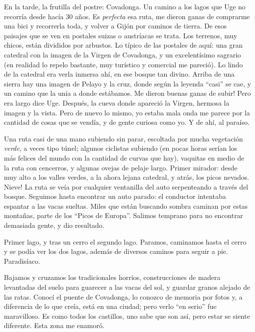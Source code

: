 En la tarde, la frutilla del postre: Covadonga. Un camino a los lagos que Uge
no recorr\'ia desde hac\'ia 30 a\~nos. Es \emph{perfecta} esa ruta, me dieron
ganas de comprarme una bici y recorrerla toda, y volver a Gij\'on por caminos
de tierra. De esos paisajes que se ven en postales suizas o austr\'iacas se
trata. Los terrenos, muy chicos, est\'an divididos por arbustos. Lo t\'ipico
de las postales de aqu\'i: una gran catedral con la imagen de la Virgen de
Covadonga, y un excelent\'isimo sagrario (en realidad lo repelo bastante, muy
tur\'istico y comercial me pareci\'o). Lo lindo de la catedral era verla inmersa
ah\'i, en ese bosque tan divino. Arriba de una sierra hay una imagen de Pelayo y
la cruz, donde seg\'un la leyenda ``casi'' se cae, y un camino que la un\'ia a
donde est\'abamos. \textexclamdown Me dieron buenas ganas de subir! Pero era
largo dice Uge. Despu\'es, la cueva donde apareci\'o la Virgen, hermosa la
imagen y la vista. Pero de nuevo lo mismo, yo estaba mala onda me parece por la
cantidad de cosas que se vend\'ia, y de gente curiosa como yo. Y de ah\'i, al
para\'iso.

Una ruta casi de una mano subiendo sin parar, escoltada por mucha vegetaci\'on
\emph{verde}, a veces tipo t\'unel; algunos ciclistas subiendo (en pocas horas
ser\'ian los m\'as felices del mundo con la cantidad de curvas que hay),
vaquitas en medio de la ruta con cencerros, y algunas ovejas de pelaje largo.
Primer mirador: desde muy alto a los valles verdes, a la ahora lejana catedral,
y atr\'as, los picos nevados. \textexclamdown Nieve! La ruta se ve\'ia por
cualquier ventanilla del auto serpenteando a trav\'es del bosque. Seguimos hasta
encontrar un auto parado: el conductor intentaba espantar a las vacas sueltas.
Miles que est\'an buscando sombra caminan por estas monta\~nas, parte de los
``Picos de Europa''. Salimos temprano para no encontrar demasiada gente, y dio
resultado.

Primer lago, y tras un cerro el segundo lago. Paramos, caminamos hasta el
cerro y se pod\'ia ver los dos lagos, adem\'as de diversos caminos para seguir
a pie. Paradis\'iaco.

Bajamos y cruzamos los tradicionales horrios, construcciones de madera
levantadas del suelo para guarecer a las vacas del sol, y guardar granos
alejado de las ratas. Conoc\'i el puente de Covadonga, lo conozco de
memoria por fotos y, a diferencia de lo que cre\'ia, est\'a en una ciudad;
pero verlo ``en serio'' fue maravilloso. Es como todos los castillos, uno sabe
que son as\'i, pero estar se siente diferente. Esta zona me enamor\'o.

